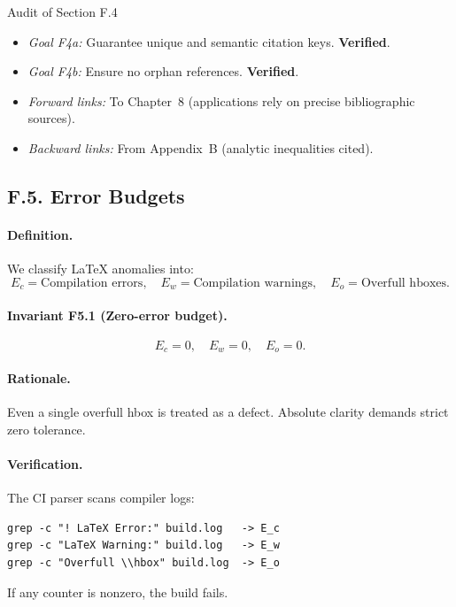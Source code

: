 \begin{auditblock}{Audit of Section F.4}
\leavevmode
\begin{itemize}
  \item \emph{Goal F4a:} Guarantee unique and semantic citation keys.
        \textbf{Verified}.
  \item \emph{Goal F4b:} Ensure no orphan references. \textbf{Verified}.
  \item \emph{Forward links:} To Chapter~8 (applications rely on
        precise bibliographic sources).
  \item \emph{Backward links:} From Appendix~B (analytic inequalities
        cited).
\end{itemize}
\end{auditblock}

\subsection*{F.5. Error Budgets}

\paragraph{Definition.}
We classify LaTeX anomalies into:
\[
E_c = \text{Compilation errors}, \quad
E_w = \text{Compilation warnings}, \quad
E_o = \text{Overfull hboxes}.
\]

\paragraph{Invariant F5.1 (Zero-error budget).}
\[
E_c = 0, \quad E_w = 0, \quad E_o = 0.
\]

\paragraph{Rationale.}
Even a single overfull hbox is treated as a defect. Absolute clarity
demands strict zero tolerance.

\paragraph{Verification.}
The CI parser scans compiler logs:
\begin{verbatim}
grep -c "! LaTeX Error:" build.log   -> E_c
grep -c "LaTeX Warning:" build.log   -> E_w
grep -c "Overfull \\hbox" build.log  -> E_o
\end{verbatim}
If any counter is nonzero, the build fails.

